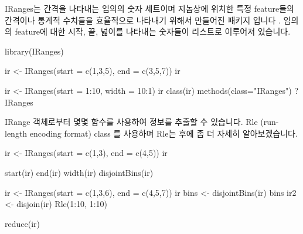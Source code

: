 \documentclass[
]{book}
\newenvironment{Shaded}{\begin{snugshade}}{\end{snugshade}}
\newcommand{\AttributeTok}[1]{\textcolor[rgb]{0.77,0.63,0.00}{#1}}
\newcommand{\DecValTok}[1]{\textcolor[rgb]{0.00,0.00,0.81}{#1}}
\newcommand{\FunctionTok}[1]{\textcolor[rgb]{0.00,0.00,0.00}{#1}}
\newcommand{\NormalTok}[1]{#1}
\newcommand{\OtherTok}[1]{\textcolor[rgb]{0.56,0.35,0.01}{#1}}
\newcommand{\SpecialCharTok}[1]{\textcolor[rgb]{0.00,0.00,0.00}{#1}}
\newcommand{\StringTok}[1]{\textcolor[rgb]{0.31,0.60,0.02}{#1}}
\begin{document}
IRanges는 간격을 나타내는 임의의 숫자 세트이며 지놈상에 위치한 특정 feature들의 간격이나 통계적 수치들을 효율적으로 나타내기 위해서 만들어진 패키지 입니다 \citep{Lawrence2013}. 임의의 feature에 대한 시작, 끝, 넓이를 나타내는 숫자들이 리스트로 이루어져 있습니다.

\begin{Shaded}
\begin{Highlighting}[]
\FunctionTok{library}\NormalTok{(IRanges)}

\NormalTok{ir }\OtherTok{\textless{}{-}} \FunctionTok{IRanges}\NormalTok{(}\AttributeTok{start =} \FunctionTok{c}\NormalTok{(}\DecValTok{1}\NormalTok{,}\DecValTok{3}\NormalTok{,}\DecValTok{5}\NormalTok{), }\AttributeTok{end =} \FunctionTok{c}\NormalTok{(}\DecValTok{3}\NormalTok{,}\DecValTok{5}\NormalTok{,}\DecValTok{7}\NormalTok{))}
\NormalTok{ir}

\NormalTok{ir }\OtherTok{\textless{}{-}} \FunctionTok{IRanges}\NormalTok{(}\AttributeTok{start =} \DecValTok{1}\SpecialCharTok{:}\DecValTok{10}\NormalTok{, }\AttributeTok{width =} \DecValTok{10}\SpecialCharTok{:}\DecValTok{1}\NormalTok{)}
\NormalTok{ir}
\FunctionTok{class}\NormalTok{(ir)}
\FunctionTok{methods}\NormalTok{(}\AttributeTok{class=}\StringTok{"IRanges"}\NormalTok{)}
\NormalTok{?IRanges}
\end{Highlighting}
\end{Shaded}

IRange 객체로부터 몇몇 함수를 사용하여 정보를 추출할 수 있습니다. Rle (run-length encoding format) class 를 사용하며 Rle는 후에 좀 더 자세히 알아보겠습니다.

\begin{Shaded}
\begin{Highlighting}[]
\NormalTok{ir }\OtherTok{\textless{}{-}} \FunctionTok{IRanges}\NormalTok{(}\AttributeTok{start =} \FunctionTok{c}\NormalTok{(}\DecValTok{1}\NormalTok{,}\DecValTok{3}\NormalTok{), }\AttributeTok{end =} \FunctionTok{c}\NormalTok{(}\DecValTok{4}\NormalTok{,}\DecValTok{5}\NormalTok{))}
\NormalTok{ir}

\FunctionTok{start}\NormalTok{(ir)}
\FunctionTok{end}\NormalTok{(ir)}
\FunctionTok{width}\NormalTok{(ir)}
\FunctionTok{disjointBins}\NormalTok{(ir)}

\NormalTok{ir }\OtherTok{\textless{}{-}} \FunctionTok{IRanges}\NormalTok{(}\AttributeTok{start =} \FunctionTok{c}\NormalTok{(}\DecValTok{1}\NormalTok{,}\DecValTok{3}\NormalTok{,}\DecValTok{6}\NormalTok{), }\AttributeTok{end =} \FunctionTok{c}\NormalTok{(}\DecValTok{4}\NormalTok{,}\DecValTok{5}\NormalTok{,}\DecValTok{7}\NormalTok{))}
\NormalTok{ir}
\NormalTok{bins }\OtherTok{\textless{}{-}} \FunctionTok{disjointBins}\NormalTok{(ir)}
\NormalTok{bins}
\NormalTok{ir2 }\OtherTok{\textless{}{-}} \FunctionTok{disjoin}\NormalTok{(ir)}
\FunctionTok{Rle}\NormalTok{(}\DecValTok{1}\SpecialCharTok{:}\DecValTok{10}\NormalTok{, }\DecValTok{1}\SpecialCharTok{:}\DecValTok{10}\NormalTok{)}

\FunctionTok{reduce}\NormalTok{(ir)}
\end{Highlighting}
\end{Shaded}
\end{document}
